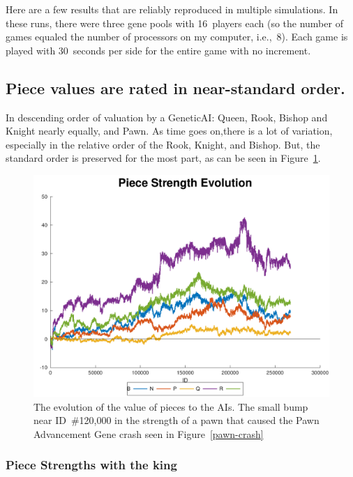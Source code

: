 \documentclass[letterpaper]{article}
\renewcommand{\_}{\allowbreak\textunderscore\allowbreak}
\begin{document}
Here are a few results that are reliably reproduced in multiple simulations. In these runs, there were three gene pools with 16~players each (so the number of games equaled the number of processors on my computer, i.e.,~8). Each game is played with 30~seconds per side for the entire game with no increment.

\subsection{Piece values are rated in near-standard order.}
In descending order of valuation by a Genetic\_AI\@: Queen, Rook, Bishop and Knight nearly equally, and Pawn. As time goes on,there is a lot of variation, especially in the relative order of the Rook, Knight, and Bishop. But, the standard order is preserved for the most part, as can be seen in Figure~\ref{piece-value-plot}.
\begin{figure}[htb]
	\centering
	\includegraphics[width=\textwidth]{pawn-crash-strength-plot}
	\caption{The evolution of the value of pieces to the AIs. The small bump near ID~\#120,000 in the strength of a pawn that caused the Pawn Advancement Gene crash seen in Figure~\ref{pawn-crash}}\label{piece-value-plot}
\end{figure}

\subsubsection{Piece Strengths with the king}\label{piece-strength-with-king}
\end{document}
